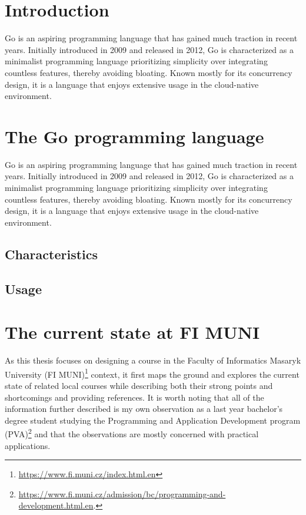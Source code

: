 \documentclass[
  digital,
  color,
  oneside,
  nosansbold,
  nocolorbold,
  lof,
  lot,
]{fithesis4}
\begin{document}
\chapter{Introduction}

Go is an aspiring programming language that has gained much traction in recent years. Initially introduced in 2009 and released in 2012, Go is characterized as a minimalist programming language prioritizing simplicity over integrating countless features, thereby avoiding bloating. Known mostly for its concurrency design, it is a language that enjoys extensive usage in the cloud-native environment.

\chapter{The Go programming language}

Go is an aspiring programming language that has gained much traction in recent years. Initially introduced in 2009 and released in 2012, Go is characterized as a minimalist programming language prioritizing simplicity over integrating countless features, thereby avoiding bloating. Known mostly for its concurrency design, it is a language that enjoys extensive usage in the cloud-native environment.

\section{Characteristics}

\section{Usage}

\chapter{The current state at FI MUNI}

As this thesis focuses on designing a course in the Faculty of Informatics Masaryk University (FI MUNI)\footnote{\url{https://www.fi.muni.cz/index.html.en}} context, it first maps the ground and explores the current state of related local courses while describing both their strong points and shortcomings and providing references. It is worth noting that all of the information further described is my own observation as a last year bachelor's degree student studying the Programming and Application Development program (PVA)\footnote{\url{https://www.fi.muni.cz/admission/bc/programming-and-development.html.en}.} and that the observations are mostly concerned with practical applications.
\end{document}
